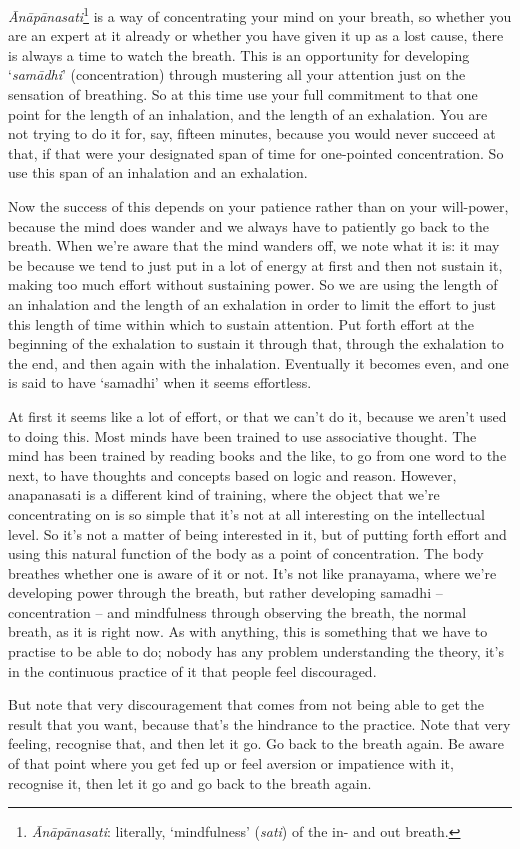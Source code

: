 
\textit{\=An\=ap\=anasati}\footnote{\textit{\=An\=ap\=anasati}: literally, `mindfulness' (\textit{sati}) of the in- and out breath.} is a way of concentrating your mind on your breath, so whether you are an expert at it already or whether you have given it up as a lost cause, there is always a time to watch the breath. This is an opportunity for developing `\textit{sam\=adhi}' (concentration) through mustering all your attention just on the sensation of breathing. So at this time use your full commitment to that one point for the length of an inhalation, and the length of an exhalation. You are not trying to do it for, say, fifteen minutes, because you would never succeed at that, if that were your designated span of time for one-pointed concentration. So use this span of an inhalation and an exhalation.

Now the success of this depends on your patience rather than on your will-power, because the mind does wander and we always have to patiently go back to the breath. When we're aware that the mind wanders off, we note what it is: it may be because we tend to just put in a lot of energy at first and then not sustain it, making too much effort without sustaining power. So we are using the length of an inhalation and the length of an exhalation in order to limit the effort to just this length of time within which to sustain attention. Put forth effort at the beginning of the exhalation to sustain it through that, through the exhalation to the end, and then again with the inhalation. Eventually it becomes even, and one is said to have `samadhi' when it seems effortless.

At first it seems like a lot of effort, or that we can't do it, because we aren't used to doing this. Most minds have been trained to use associative thought. The mind has been trained by reading books and the like, to go from one word to the next, to have thoughts and concepts based on logic and reason. However, anapanasati is a different kind of training, where the object that we're concentrating on is so simple that it's not at all interesting on the intellectual level. So it's not a matter of being interested in it, but of putting forth effort and using this natural function of the body as a point of concentration. The body breathes whether one is aware of it or not. It's not like pranayama, where we're developing power through the breath, but rather developing samadhi -- concentration -- and mindfulness through observing the breath, the normal breath, as it is right now. As with anything, this is something that we have to practise to be able to do; nobody has any problem understanding the theory, it's in the continuous practice of it that people feel discouraged.

But note that very discouragement that comes from not being able to get the result that you want, because that's the hindrance to the practice. Note that very feeling, recognise that, and then let it go. Go back to the breath again. Be aware of that point where you get fed up or feel aversion or impatience with it, recognise it, then let it go and go back to the breath again.
